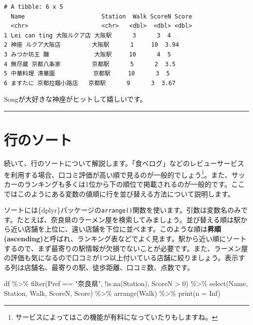 \documentclass[
  a4paper,
  pandoc,
  ja=standard,
  jafont=haranoaji]{bxjsbook}
\newenvironment{Shaded}{\begin{snugshade}}{\end{snugshade}}
\newcommand{\AttributeTok}[1]{\textcolor[rgb]{0.00,0.48,0.65}{#1}}
\newcommand{\ConstantTok}[1]{\textcolor[rgb]{0.56,0.35,0.01}{#1}}
\newcommand{\DecValTok}[1]{\textcolor[rgb]{0.68,0.00,0.00}{#1}}
\newcommand{\FunctionTok}[1]{\textcolor[rgb]{0.28,0.35,0.67}{#1}}
\newcommand{\NormalTok}[1]{\textcolor[rgb]{0.00,0.48,0.65}{#1}}
\newcommand{\SpecialCharTok}[1]{\textcolor[rgb]{0.37,0.37,0.37}{#1}}
\newcommand{\StringTok}[1]{\textcolor[rgb]{0.13,0.47,0.30}{#1}}
\begin{document}
\begin{verbatim}
# A tibble: 6 x 5
  Name                      Station  Walk ScoreN Score
  <chr>                     <chr>   <dbl>  <dbl> <dbl>
1 Lei can ting 大阪ルクア店 大阪駅      3      3  4   
2 神座 ルクア大阪店         大阪駅      1     10  3.94
3 みつか坊主 醸             大阪駅     10      4  5   
4 無尽蔵 京都八条家         京都駅      5      2  3.5 
5 中華料理 清華園           京都駅     10      3  5   
6 ますたに 京都拉麺小路店   京都駅      9      3  3.67
\end{verbatim}

Songが大好きな神座がヒットして嬉しいです。

\begin{center}\rule{0.5\linewidth}{0.5pt}\end{center}

\hypertarget{sec-handling1_arrange}{%
\section{行のソート}\label{sec-handling1_arrange}}

続いて、行のソートについて解説します。「食べログ」などのレビューサービスを利用する場合、口コミ評価が高い順で見るのが一般的でしょう\footnote{サービスによってはこの機能が有料になっていたりもしますね。}。また、サッカーのランキングも多くは1位から下の順位で掲載されるのが一般的です。ここではこのようにある変数の値順に行を並び替える方法について説明します。

ソートには\{dplyr\}パッケージの\texttt{arrange()}関数を使います。引数は変数名のみです。たとえば、奈良県のラーメン屋を検索してみましょう。並び替える順は駅から近い店舗を上位に、遠い店舗を下位に並べます。このような順は\textbf{昇順
(ascending)}と呼ばれ、ランキング表などでよく見ます。駅から近い順にソートするので、まず最寄りの駅情報が欠損でないことが必要です。また、ラーメン屋の評価も気になるので口コミが1つ以上付いている店舗に絞りましょう。表示する列は店舗名、最寄りの駅、徒歩距離、口コミ数、点数です。

\begin{Shaded}
\begin{Highlighting}[numbers=left,,]
\NormalTok{df }\SpecialCharTok{\%\textgreater{}\%}
  \FunctionTok{filter}\NormalTok{(Pref }\SpecialCharTok{==} \StringTok{"奈良県"}\NormalTok{, }\SpecialCharTok{!}\FunctionTok{is.na}\NormalTok{(Station), ScoreN }\SpecialCharTok{\textgreater{}} \DecValTok{0}\NormalTok{) }\SpecialCharTok{\%\textgreater{}\%}
  \FunctionTok{select}\NormalTok{(Name, Station, Walk, ScoreN, Score) }\SpecialCharTok{\%\textgreater{}\%}
  \FunctionTok{arrange}\NormalTok{(Walk) }\SpecialCharTok{\%\textgreater{}\%}
  \FunctionTok{print}\NormalTok{(}\AttributeTok{n =} \ConstantTok{Inf}\NormalTok{)}
\end{Highlighting}
\end{Shaded}
\end{document}
